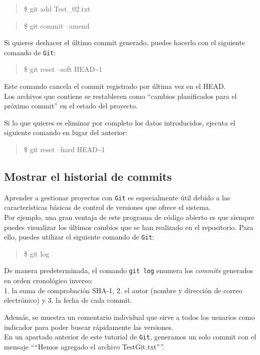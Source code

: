\documentclass[11pt]{article}
\begin{document}
\begin{quote}
\$ git add Test\_02.txt
\end{quote}

\begin{quote}
\$ git commit --amend
\end{quote}

Si quieres deshacer el último commit generado, puedes hacerlo con el
siguiente comando de \texttt{Git}:

\begin{quote}
\$ git reset --soft HEAD\textasciitilde{}1
\end{quote}

Este comando cancela el commit registrado por última vez en el HEAD.\\
Los archivos que contiene se restablecen como ``cambios planificados
para el próximo commit'' en el estado del proyecto.

Si lo que quieres es eliminar por completo los datos introducidos,
ejecuta el siguiente comando en lugar del anterior:

\begin{quote}
\$ git reset --hard HEAD\textasciitilde{}1
\end{quote}

    \hypertarget{mostrar-el-historial-de-commits}{%
\subsection{Mostrar el historial de
commits}\label{mostrar-el-historial-de-commits}}

Aprender a gestionar proyectos con \texttt{Git} es especialmente útil
debido a las características básicas de control de versiones que ofrece
el sistema.\\
Por ejemplo, una gran ventaja de este programa de código abierto es que
siempre puedes visualizar los últimos cambios que se han realizado en el
repositorio. Para ello, puedes utilizar el siguiente comando de
\texttt{Git}:

\begin{quote}
\$ git log
\end{quote}

De manera predeterminada, el comando \texttt{git\ log} enumera los
\emph{commits} generados en orden cronológico inverso:\\
1. la suma de comprobación SHA-1, 2. el autor (nombre y dirección de
correo electrónico) y 3. la fecha de cada commit.

Además, se muestra un comentario individual que sirve a todos los
usuarios como indicador para poder buscar rápidamente las versiones.\\
En un apartado anterior de este tutorial de \texttt{Git}, generamos un
solo commit con el mensaje ````Hemos agregado el archivo
TestGit.txt''''.
\end{document}
